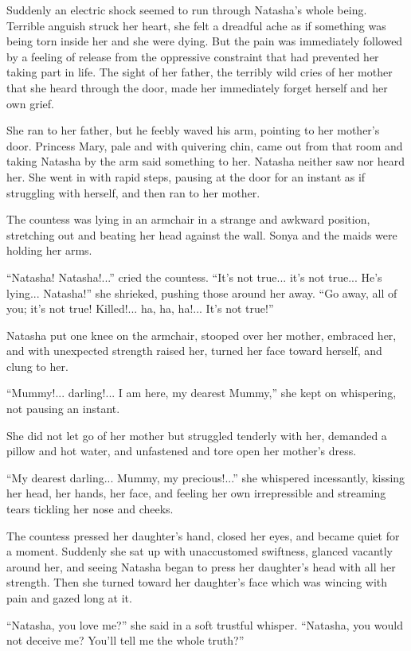 Suddenly an electric shock seemed to run through Natasha's whole
being.  Terrible anguish struck her heart, she felt a dreadful
ache as if something was being torn inside her and she were
dying. But the pain was immediately followed by a feeling of
release from the oppressive constraint that had prevented her
taking part in life. The sight of her father, the terribly wild
cries of her mother that she heard through the door, made her
immediately forget herself and her own grief.

She ran to her father, but he feebly waved his arm, pointing to
her mother's door. Princess Mary, pale and with quivering chin,
came out from that room and taking Natasha by the arm said
something to her.  Natasha neither saw nor heard her. She went in
with rapid steps, pausing at the door for an instant as if
struggling with herself, and then ran to her mother.

The countess was lying in an armchair in a strange and awkward
position, stretching out and beating her head against the
wall. Sonya and the maids were holding her arms.

``Natasha! Natasha!...'' cried the countess. ``It's not
true... it's not true... He's lying... Natasha!'' she shrieked,
pushing those around her away. ``Go away, all of you; it's not
true! Killed!... ha, ha, ha!...  It's not true!''

Natasha put one knee on the armchair, stooped over her mother,
embraced her, and with unexpected strength raised her, turned her
face toward herself, and clung to her.

``Mummy!... darling!... I am here, my dearest Mummy,'' she kept
on whispering, not pausing an instant.

She did not let go of her mother but struggled tenderly with her,
demanded a pillow and hot water, and unfastened and tore open her
mother's dress.

``My dearest darling... Mummy, my precious!...'' she whispered
incessantly, kissing her head, her hands, her face, and feeling
her own irrepressible and streaming tears tickling her nose and
cheeks.

The countess pressed her daughter's hand, closed her eyes, and
became quiet for a moment. Suddenly she sat up with unaccustomed
swiftness, glanced vacantly around her, and seeing Natasha began
to press her daughter's head with all her strength. Then she
turned toward her daughter's face which was wincing with pain and
gazed long at it.

``Natasha, you love me?'' she said in a soft trustful
whisper. ``Natasha, you would not deceive me? You'll tell me the
whole truth?''

